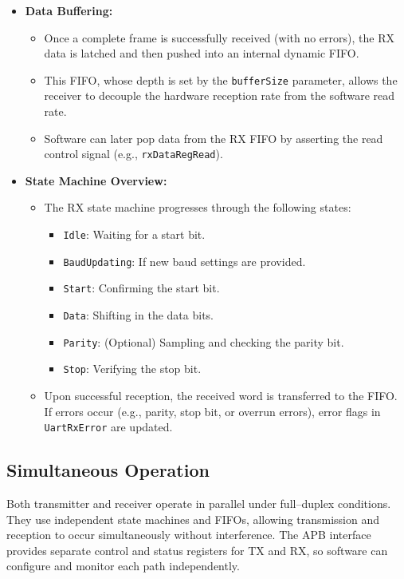 \begin{itemize}
    \item \textbf{Data Buffering:}
    \begin{itemize}
        \item Once a complete frame is successfully received (with no errors), the RX data is latched and then pushed into an internal dynamic FIFO.
        \item This FIFO, whose depth is set by the \texttt{bufferSize} parameter, allows the receiver to decouple the hardware reception rate from the software read rate.
        \item Software can later pop data from the RX FIFO by asserting the read control signal (e.g., \texttt{rxDataRegRead}).
    \end{itemize}
    
    \item \textbf{State Machine Overview:}
    \begin{itemize}
        \item The RX state machine progresses through the following states:
            \begin{itemize}
                \item \texttt{Idle}: Waiting for a start bit.
                \item \texttt{BaudUpdating}: If new baud settings are provided.
                \item \texttt{Start}: Confirming the start bit.
                \item \texttt{Data}: Shifting in the data bits.
                \item \texttt{Parity}: (Optional) Sampling and checking the parity bit.
                \item \texttt{Stop}: Verifying the stop bit.
            \end{itemize}
        \item Upon successful reception, the received word is transferred to the FIFO. If errors occur (e.g., parity, stop bit, or overrun errors), error flags in \texttt{UartRxError} are updated.
    \end{itemize}
\end{itemize}

\subsection{Simultaneous Operation}

Both transmitter and receiver operate in parallel under full–duplex conditions. They use independent state machines and FIFOs, allowing transmission and reception to occur simultaneously without interference. The APB interface provides separate control and status registers for TX and RX, so software can configure and monitor each path independently.

